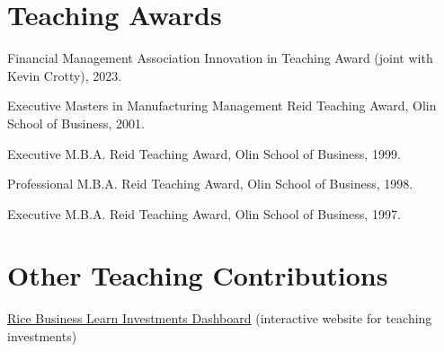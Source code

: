 \documentclass[margin, 11pt]{res}
\newenvironment{list1}{
  \begin{list}{}{%
            \setlength{\itemsep}{0in}
      \setlength{\parsep}{0in} \setlength{\parskip}{0in}
      \setlength{\topsep}{0in} \setlength{\partopsep}{0in}
      \setlength{\leftmargin}{0.2in}}}{\end{list}}
\newenvironment{list3}{
  \begin{list}{}{%
            \setlength{\itemsep}{0in}
      \setlength{\parsep}{0in} \setlength{\parskip}{0in}
      \setlength{\topsep}{0in} \setlength{\partopsep}{0in}
      \setlength{\leftmargin}{0.2in}}}{\vspace*{.15in}\end{list}}
\begin{document}
\begin{resume}
\begin{list1}
\begin{list3}
 
 
\end{list3}
\vspace*{-.15in}
\end{list1}

\section{\sc Teaching Awards}
\begin{list1}
  \item Financial Management Association Innovation in Teaching Award (joint with Kevin Crotty), 2023.
\item Executive Masters in Manufacturing Management Reid Teaching Award, Olin School of Business, 2001.
\item Executive M.B.A. Reid Teaching Award, Olin School of Business, 1999.
 \item Professional M.B.A. Reid Teaching Award, Olin School of Business, 1998.
 \item Executive M.B.A. Reid Teaching Award, Olin School of Business, 1997.
\end{list1}

\newpage

\section{\sc Other Teaching Contributions}
\begin{list1}
\item \href{http://learn-investments.rice-business.org}{Rice Business Learn Investments Dashboard} (interactive website for teaching investments)
\end{list1}


\end{resume}
\end{document}
